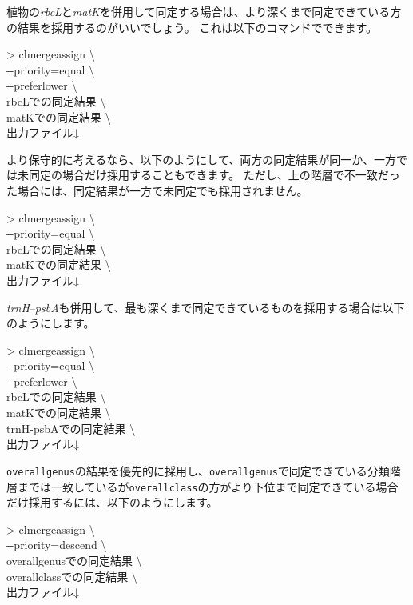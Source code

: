 \documentclass[titlepage,10pt,a4paper]{jsbook}
\newenvironment{cmd}{\begin{oframed}\raggedright\ttfamily\footnotesize\setlength{\baselineskip}{1.4em}}{\end{oframed}\vspace{-1em}}
\begin{document}
植物の\textit{rbcL}と\textit{matK}を併用して同定する場合は、より深くまで同定できている方の結果を採用するのがいいでしょう。
これは以下のコマンドでできます。
\begin{cmd}
{\textgreater} clmergeassign {\textbackslash}\\
{-}{-}priority=equal {\textbackslash}\\
{-}{-}preferlower {\textbackslash}\\
rbcLでの同定結果 {\textbackslash}\\
matKでの同定結果 {\textbackslash}\\
出力ファイル↓
\end{cmd}
より保守的に考えるなら、以下のようにして、両方の同定結果が同一か、一方では未同定の場合だけ採用することもできます。
ただし、上の階層で不一致だった場合には、同定結果が一方で未同定でも採用されません。
\begin{cmd}
{\textgreater} clmergeassign {\textbackslash}\\
{-}{-}priority=equal {\textbackslash}\\
rbcLでの同定結果 {\textbackslash}\\
matKでの同定結果 {\textbackslash}\\
出力ファイル↓
\end{cmd}
\textit{trnH}--\textit{psbA}も併用して、最も深くまで同定できているものを採用する場合は以下のようにします。
\begin{cmd}
{\textgreater} clmergeassign {\textbackslash}\\
{-}{-}priority=equal {\textbackslash}\\
{-}{-}preferlower {\textbackslash}\\
rbcLでの同定結果 {\textbackslash}\\
matKでの同定結果 {\textbackslash}\\
trnH-psbAでの同定結果 {\textbackslash}\\
出力ファイル↓
\end{cmd}
\texttt{overall{\textunderscore}genus}の結果を優先的に採用し、\texttt{overall{\textunderscore}genus}で同定できている分類階層までは一致しているが\texttt{overall{\textunderscore}class}の方がより下位まで同定できている場合だけ採用するには、以下のようにします。
\begin{cmd}
{\textgreater} clmergeassign {\textbackslash}\\
{-}{-}priority=descend {\textbackslash}\\
overall{\textunderscore}genusでの同定結果 {\textbackslash}\\
overall{\textunderscore}classでの同定結果 {\textbackslash}\\
出力ファイル↓
\end{cmd}
\end{document}
